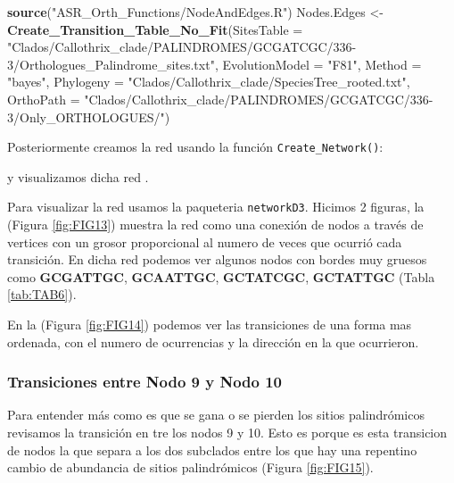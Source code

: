 \documentclass[
]{book}
\newenvironment{Shaded}{\begin{snugshade}}{\end{snugshade}}
\newcommand{\AttributeTok}[1]{\textcolor[rgb]{0.13,0.29,0.53}{#1}}
\newcommand{\FunctionTok}[1]{\textcolor[rgb]{0.13,0.29,0.53}{\textbf{#1}}}
\newcommand{\NormalTok}[1]{#1}
\newcommand{\OtherTok}[1]{\textcolor[rgb]{0.56,0.35,0.01}{#1}}
\newcommand{\StringTok}[1]{\textcolor[rgb]{0.31,0.60,0.02}{#1}}
\begin{document}
\begin{Shaded}
\begin{Highlighting}[]
\FunctionTok{source}\NormalTok{(}\StringTok{"ASR\_Orth\_Functions/NodeAndEdges.R"}\NormalTok{)}
\NormalTok{Nodes.Edges }\OtherTok{\textless{}{-}} \FunctionTok{Create\_Transition\_Table\_No\_Fit}\NormalTok{(}\AttributeTok{SitesTable =} \StringTok{"Clados/Callothrix\_clade/PALINDROMES/GCGATCGC/336{-}3/Orthologues\_Palindrome\_sites.txt"}\NormalTok{,}
                                \AttributeTok{EvolutionModel =} \StringTok{"F81"}\NormalTok{,}
                                \AttributeTok{Method =} \StringTok{"bayes"}\NormalTok{,}
                                \AttributeTok{Phylogeny =} \StringTok{"Clados/Callothrix\_clade/SpeciesTree\_rooted.txt"}\NormalTok{,}
                                \AttributeTok{OrthoPath =} \StringTok{"Clados/Callothrix\_clade/PALINDROMES/GCGATCGC/336{-}3/Only\_ORTHOLOGUES/"}\NormalTok{)}
\end{Highlighting}
\end{Shaded}

Posteriormente creamos la red usando la función \texttt{Create\_Network()}:

y visualizamos dicha red .

Para visualizar la red usamos la paqueteria \texttt{networkD3}. Hicimos 2 figuras, la (Figura \ref{fig:FIG13}) muestra la red como una conexión de nodos a través de vertices con un grosor proporcional al numero de veces que ocurrió cada transición. En dicha red podemos ver algunos nodos con bordes muy gruesos como \textbf{GCGATTGC}, \textbf{GCAATTGC}, \textbf{GCTATCGC}, \textbf{GCTATTGC} (Tabla \ref{tab:TAB6}).

En la (Figura \ref{fig:FIG14}) podemos ver las transiciones de una forma mas ordenada, con el numero de ocurrencias y la dirección en la que ocurrieron.

\hypertarget{transiciones-entre-nodo-9-y-nodo-10}{%
\subsubsection{Transiciones entre Nodo 9 y Nodo 10}\label{transiciones-entre-nodo-9-y-nodo-10}}

Para entender más como es que se gana o se pierden los sitios palindrómicos revisamos la transición en tre los nodos 9 y 10. Esto es porque es esta transicion de nodos la que separa a los dos subclados entre los que hay una repentino cambio de abundancia de sitios palindrómicos (Figura \ref{fig:FIG15}).
\end{document}
